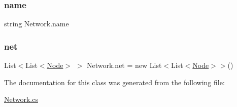 \mbox{\label{class_network_a9d47011c0cdd1c2c2a17f487fc20aa74}} 
\subsubsection{\texorpdfstring{name}{name}}
{\footnotesize\ttfamily string Network.\+name}

\mbox{\label{class_network_a5575fb3cc8b86da6ff8ffed15634e4b4}} 
\subsubsection{\texorpdfstring{net}{net}}
{\footnotesize\ttfamily List$<$List$<$\mbox{\hyperlink{class_node}{Node}}$>$ $>$ Network.\+net = new List$<$List$<$\mbox{\hyperlink{class_node}{Node}}$>$$>$()}



The documentation for this class was generated from the following file\+:\begin{DoxyCompactItemize}
\item 
\mbox{\hyperlink{_network_8cs}{Network.\+cs}}\end{DoxyCompactItemize}
